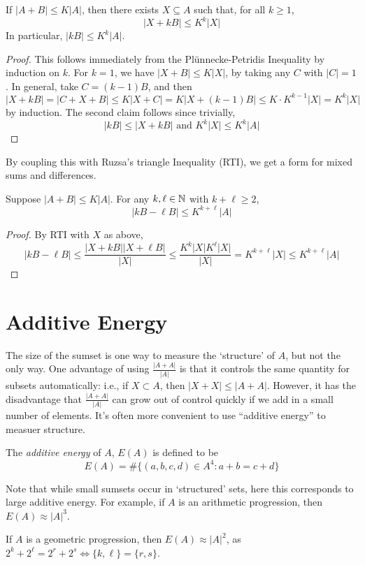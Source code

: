 \documentclass[10pt,a4paper]{article}
\begin{document}
\begin{corollary}
  If $|A+B|\leq K|A|$, then there exists $X \subseteq A$ such that, for all $k\geq 1$,
  \[|X+kB| \leq K^k|X|\]
  In particular, $|kB| \leq K^{k}|A|$.
\end{corollary}
\begin{proof}
  This follows immediately from the Pl\"unnecke-Petridis Inequality by induction on $k$. For $k=1$, we have $|X+B|\leq K|X|$, by taking any $C$ with $|C|=1$. In general, take $C = (k-1)B$, and then
  \[|X+kB| = |C+X+B| \leq K|X+C| = K|X+(k-1)B| \leq K\cdot K^{k-1}|X| = K^k|X|\]
  by induction. The second claim follows since trivially,
  \[|kB| \leq |X+kB| \text{ and } K^k|X| \leq K^k|A|\]
\end{proof}
By coupling this with Ruzsa's triangle Inequality (RTI), we get a form for mixed sums and differences.
\begin{corollary}
  Suppose $|A+B|\leq K|A|$. For any $k, \ell \in \mathbb{N}$ with $k+\ell \geq 2$,
  \[|kB - \ell B| \leq K^{k+\ell}|A|\]
\end{corollary}
\begin{proof}
  By RTI with $X$ as above,
  \[|kB-\ell B| \leq \frac{|X+kB||X+\ell B|}{|X|} \leq \frac{K^k|X|K^\ell|X|}{|X|} =K^{k+\ell}|X| \leq K^{k+\ell}|A|\]
\end{proof}
\section{Additive Energy}
The size of the sumset is one way to measure the `structure' of $A$, but not the only way. One advantage of using $\frac{|A+A|}{|A|}$ is that it controls the same quantity for subsets automatically: i.e., if $X \subset A$, then $|X+X| \leq |A+A|$. However, it has the disadvantage that $\frac{|A+A|}{|A|}$ can grow out of control quickly if we add in a small number of elements. It's often more convenient to use ``additive energy'' to measuer structure.
\begin{definition}
  The \emph{additive energy} of $A$, $E(A)$ is defined to be
  \[E(A) = \#\{(a,b,c,d) \in A^4: a+b=c+d\}\]
\end{definition}
Note that while small sumsets occur in `structured' sets, here this corresponds to large additive energy. For example, if $A$ is an arithmetic progression, then $E(A) \approx |A|^3$.

If $A$ is a geometric progression, then $E(A) \approx |A|^2$, as $2^k + 2^\ell = 2^r + 2^s \iff \{k,\ell\} = \{r,s\}$.
\end{document}
